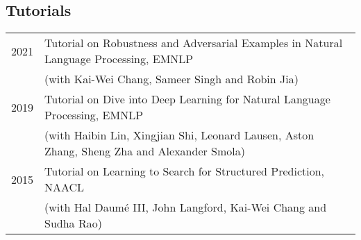 \documentclass[a4paper,11pt]{article}
\begin{document}
\subsection{Tutorials}
\begin{tabular}{rl}
    2021 & Tutorial on Robustness and Adversarial Examples in Natural Language Processing, EMNLP\\
         & (with Kai-Wei Chang, Sameer Singh and Robin Jia) \\
    2019 & Tutorial on Dive into Deep Learning for Natural Language Processing, EMNLP \\
         & (with Haibin Lin, Xingjian Shi, Leonard Lausen, Aston Zhang, Sheng Zha and Alexander Smola) \\
    2015 & Tutorial on Learning to Search for Structured Prediction, NAACL \\
         & (with Hal Daum\'e III, John Langford, Kai-Wei Chang and Sudha Rao)
\end{tabular}
\end{document}
